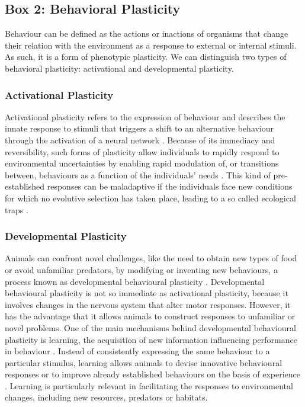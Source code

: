 \begin{small}
\begin{framed}
\subsection*{Box 2: Behavioral Plasticity}

Behaviour can be defined as the actions or inactions of organisms that change
their relation with the environment as a response to external or internal
stimuli. As such, it is a form of phenotypic plasticity. We can distinguish two
types of behavioral plasticity: activational and developmental plasticity.

\subsubsection*{Activational Plasticity}

Activational plasticity refers to the expression of behaviour and describes the
innate response to stimuli that triggers a shift to an alternative behaviour
through the activation of a neural network \citep{Snell-Rood2013}. Because of
its immediacy and reversibility, such forms of plasticity allow individuals to
rapidly respond to environmental uncertainties by enabling rapid modulation
of, or transitions between, behaviours as a function of the individuals’ needs
\citep{Snell-Rood2013,Sol2013a}. This kind of pre-established responses can be
maladaptive if the individuals face new conditions for which no evolutive
selection has taken place, leading to a so called ecological traps
\citep{Kokko2001}.

\subsubsection*{Developmental Plasticity}

Animals can confront novel challenges, like the need to obtain new types of food
or avoid unfamiliar predators, by modifying or inventing new behaviours, a
process known as developmental behavioural plasticity \citep{Snell-Rood2013}.
Developmental behavioural plasticity is not so immediate as activational
plasticity, because it involves changes in the nervous system that alter motor
responses. However, it has the advantage that it allows animals to construct
responses to unfamiliar or novel problems. One of the main mechanisms behind
developmental behavioural plasticity is learning, the acquisition of new
information influencing performance in behaviour \citep{Dukas1998}. Instead of
consistently expressing the same behaviour to a particular stimulus, learning
allows animals to devise innovative behavioural responses or to improve already
established behaviours on the basis of experience
\citep{Lefebvre1997,Dukas1998,Reader2002,VanSchaik2003,Ricklefs2004}. Learning
is particularly relevant in facilitating the responses to environmental changes,
including new resources, predators or habitats.
\end{framed}
\end{small}


